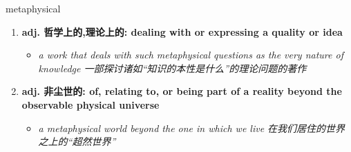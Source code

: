 
\begin{frame}
{\huge metaphysical}
\begin{center}
\begin{enumerate}\Large
  \item \textbf{adj. 哲学上的,理论上的: dealing with or expressing a quality or idea}
  \begin{itemize}
    \item \em{\Large{a work that deals with such metaphysical questions as the very nature of knowledge 一部探讨诸如“知识的本性是什么”的理论问题的著作}}
  \end{itemize}
  \item \textbf{adj. 非尘世的: of, relating to, or being part of a reality beyond the observable physical universe}
  \begin{itemize}
    \item \em{\Large{a metaphysical world beyond the one in which we live 在我们居住的世界之上的“超然世界”}}
  \end{itemize}
\end{enumerate}
\end{center}
\end{frame}
